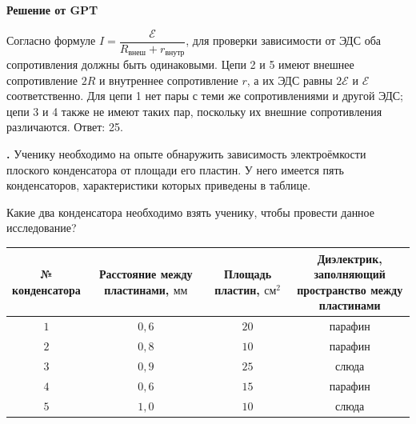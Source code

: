\documentclass[12pt,a4paper]{article}
\newif\ifShowSolutions
\newcounter{banktask}
\newcommand{\BankTask}[3]{%
  \refstepcounter{banktask}%
  \Needspace{35mm}\par\medskip\noindent\begin{minipage}{\linewidth}%
  \noindent\textbf{\thebanktask.}\quad #2\par
  \ifShowSolutions
    #3\par
    \ifdefined\TutorEdition
      \ifcsname TutorSource#1\endcsname
        \smallskip{\small\csname TutorSource#1\endcsname\par}%
      \fi
    \fi
  \fi
  \end{minipage}\par\medskip
}
\begin{document}
{\begin{center}
\end{center}
}{
\smallskip\noindent\textbf{Решение от GPT}\par
Согласно формуле $I=\dfrac{\mathcal{E}}{R_{\text{внеш}}+r_{\text{внутр}}}$, для проверки зависимости от ЭДС оба сопротивления должны быть одинаковыми. Цепи 2 и 5 имеют внешнее сопротивление $2R$ и внутреннее сопротивление $r$, а их ЭДС равны $2\mathcal{E}$ и $\mathcal{E}$ соответственно. Для цепи 1 нет пары с теми же сопротивлениями и другой ЭДС; цепи 3 и 4 также не имеют таких пар, поскольку их внешние сопротивления различаются. Ответ: 25.
}

\BankTask{82e66e}{
Ученику необходимо на опыте обнаружить зависимость электроёмкости плоского конденсатора от площади его пластин. У него имеется пять конденсаторов, характеристики которых приведены в таблице.

Какие два конденсатора необходимо взять ученику, чтобы провести данное исследование?

\begin{center}
\begin{tabular}{|c|c|c|c|}
\hline
\shortstack{№\\конденсатора} & \shortstack{Расстояние между\\пластинами, \(\text{мм}\)} & \shortstack{Площадь пластин,\\$\text{см}^{2}$} & \shortstack{Диэлектрик, заполняющий\\пространство между пластинами} \\
\hline
\(1\) & \(0{,}6\) & \(20\) & парафин \\
\hline
\(2\) & \(0{,}8\) & \(10\) & парафин \\
\hline
\(3\) & \(0{,}9\) & \(25\) & слюда \\
\hline
\(4\) & \(0{,}6\) & \(15\) & парафин \\
\hline
\(5\) & \(1{,}0\) & \(10\) & слюда \\
\hline
\end{tabular}
\end{center}
}{
\smallskip\noindent\textbf{Решение от GPT}\par
Электроёмкость плоского конденсатора $C=\varepsilon_0\varepsilon S/d$. Следует изменять площадь $S$, сохраняя расстояние $d$ и диэлектрик одинаковыми: этому условию соответствуют конденсаторы 1 и 4, у которых $d=0{,}6\,\text{мм}$, диэлектрик — парафин, а площади равны $20$ и $15\,\text{см}^2$. Ответ: 14.
}
\end{document}
